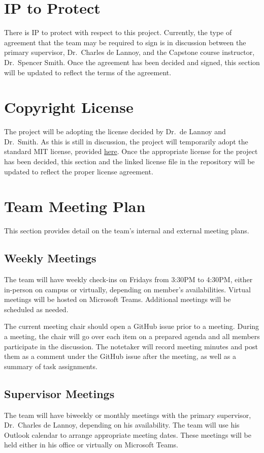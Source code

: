 \documentclass{article}
\begin{document}
\section{IP to Protect}

There is IP to protect with respect to this project. Currently, the type of
agreement that the team may be required to sign is in discussion between the
primary supervisor, Dr.\ Charles de Lannoy, and the Capstone course instructor,
Dr.\ Spencer Smith. Once the agreement has been decided and signed, this section
will be updated to reflect the terms of the agreement.

\section{Copyright License}

The project will be adopting the license decided by Dr.\ de Lannoy and Dr.\
Smith. As this is still in discussion, the project will temporarily adopt the
standard MIT license, provided
\href{https://github.com/SumanyaG/Alkalytics/blob/main/LICENSE}{here}. Once the
appropriate license for the project has been decided, this section and the
linked license file in the repository will be updated to reflect the proper
license agreement.

\section{Team Meeting Plan}
This section provides detail on the team's internal and external meeting plans.
\subsection{Weekly Meetings}
The team will have weekly check-ins on Fridays from 3:30PM to 4:30PM, either
in-person on campus or virtually, depending on member's availabilities. Virtual
meetings will be hosted on Microsoft Teams. Additional meetings will be
scheduled as needed.\newline

\noindent The current meeting chair should open a GitHub issue prior to a
meeting. During a meeting, the chair will go over each item on a prepared agenda
and all members participate in the discussion. The notetaker will record meeting
minutes and post them as a comment under the GitHub issue after the meeting, as
well as a summary of task assignments.

\subsection{Supervisor Meetings}
The team will have biweekly or monthly meetings with the primary supervisor,
Dr.\ Charles de Lannoy, depending on his availability. The team will use his
Outlook calendar to arrange appropriate meeting dates. These meetings will be
held either in his office or virtually on Microsoft Teams.\newline
\end{document}
